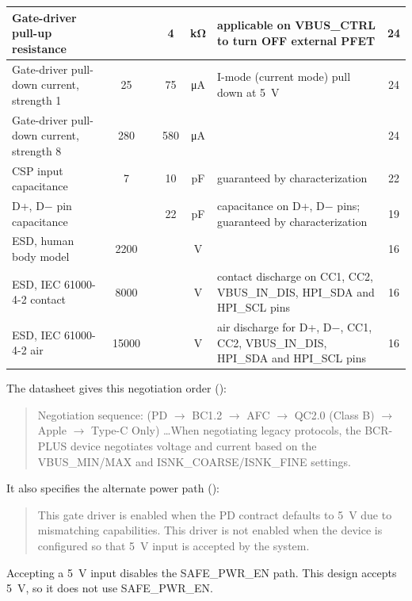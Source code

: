 {\begin{longtable}{|L{4.4cm}|c|c|c|c|L{3.6cm}|c|}
\hline
Gate-driver pull-up resistance & & & \num{4} & \si{\kilo\ohm} & applicable on VBUS\_CTRL to turn OFF external PFET & 24 \\
\hline
Gate-driver pull-down current, strength 1 & \num{25} & & \num{75} & \si{\micro\ampere} & I-mode (current mode) pull down at 5~V & 24 \\
\hline
Gate-driver pull-down current, strength 8 & \num{280} & & \num{580} & \si{\micro\ampere} & & 24 \\
\hline
CSP input capacitance & \num{7} & & \num{10} & \si{\pico\farad} & guaranteed by characterization & 22 \\
\hline
D+, D$-$ pin capacitance & & & \num{22} & \si{\pico\farad} & capacitance on D+, D\(-\) pins; guaranteed by characterization & 19 \\
\hline
ESD, human body model & \num{2200} & & & \si{\volt} & & 16 \\
\hline
ESD, IEC 61000-4-2 contact & \num{8000} & & & \si{\volt} & contact discharge on CC1, CC2, VBUS\_IN\_DIS, HPI\_SDA and HPI\_SCL pins & 16 \\
\hline
ESD, IEC 61000-4-2 air & \num{15000} & & & \si{\volt} & air discharge for D+, D\(-\), CC1, CC2, VBUS\_IN\_DIS, HPI\_SDA and HPI\_SCL pins & 16 \\
\hline
\end{longtable}
}

The datasheet gives this negotiation order
():

\begin{quote}
Negotiation sequence: (PD $\rightarrow$ BC1.2 $\rightarrow$ AFC $\rightarrow$
QC2.0 (Class B) $\rightarrow$ Apple $\rightarrow$ Type-C Only) \dots When
negotiating legacy protocols, the BCR-PLUS device negotiates voltage and current
based on the VBUS\_MIN/MAX and ISNK\_COARSE/ISNK\_FINE settings.
\end{quote}

It also specifies the alternate power path
():

\begin{quote}
This gate driver is enabled when the PD contract defaults to 5~V due to
mismatching capabilities. This driver is not enabled when the device is
configured so that 5~V input is accepted by the system.
\end{quote}

Accepting a \SI{5}{\volt} input disables the SAFE\_PWR\_EN path. This design
accepts \SI{5}{\volt}, so it does not use SAFE\_PWR\_EN.


